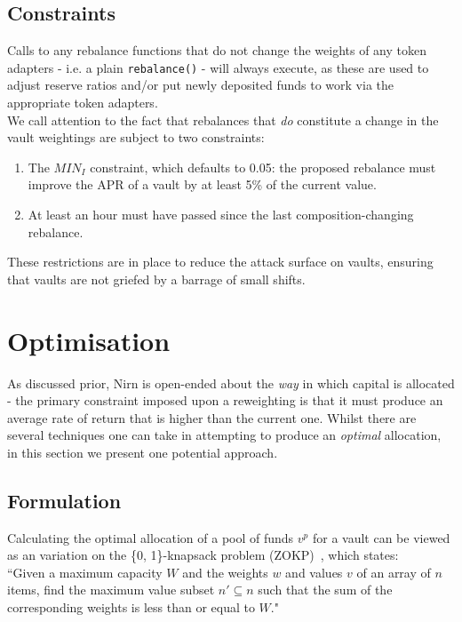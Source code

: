 \documentclass{article}
\begin{document}
\subsection{Constraints}

Calls to any rebalance functions that do not change the weights of any token adapters - i.e. a plain \texttt{rebalance()} - will always execute, as these are used to adjust reserve ratios and/or put newly deposited funds to work via the appropriate token adapters.\\

\noindent
We call attention to the fact that rebalances that \textit{do} constitute a change in the vault weightings are subject to two constraints:

\begin{enumerate}
    \item The \textit{$MIN_I$} constraint, which defaults to 0.05: the proposed rebalance must improve the APR of a vault by at least 5\% of the current value.
    \item At least an hour must have passed since the last composition-changing rebalance.
\end{enumerate}

\noindent
These restrictions are in place to reduce the attack surface on vaults, ensuring that vaults are not griefed by a barrage of small shifts. 

\newpage
\section{Optimisation}

As discussed prior, Nirn is open-ended about the \textit{way} in which capital is allocated - the primary constraint imposed upon a reweighting is that it must produce an average rate of return that is higher than the current one. Whilst there are several techniques one can take in attempting to produce an \textit{optimal} allocation, in this section we present one potential approach.

\subsection{Formulation}

Calculating the optimal allocation of a pool of funds $v^p$ for a vault can be viewed as an variation on the \{0, 1\}-knapsack problem (ZOKP)~\cite{knapsack}, which states:\\

\noindent
``Given a maximum capacity $W$ and the weights $w$ and values $v$ of an array of $n$ items, find the maximum value subset $n' \subseteq n$ such that the sum of the corresponding weights is less than or equal to $W$."
\end{document}
